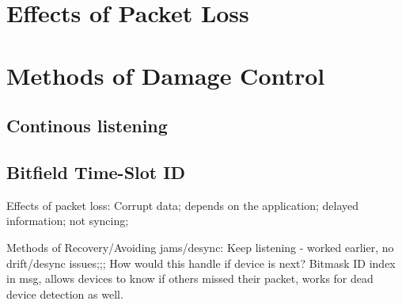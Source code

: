 \section{Effects of Packet Loss}
\section{Methods of Damage Control}
\subsection{Continous listening}
\subsection{Bitfield Time-Slot ID}

Effects of packet loss:
Corrupt data; depends on the application; delayed information; not syncing;

Methods of Recovery/Avoiding jams/desync:
Keep listening - worked earlier, no drift/desync issues;;; How would this handle if device is next?
Bitmask ID index in msg, allows devices to know if others missed their packet, works for dead device detection as well.

